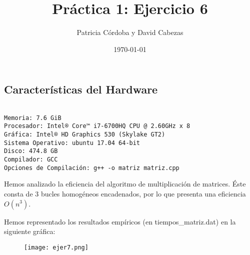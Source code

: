 \documentclass{article}
\begin{document}
\title{Práctica 1: Ejercicio 6}
\author{Patricia Córdoba y David Cabezas}
\date{\today}
\maketitle

\subsection*{Características del Hardware}
\begin{verbatim}

Memoria: 7.6 GiB
Procesador: Intel® Core™ i7-6700HQ CPU @ 2.60GHz x 8
Gráfica: Intel® HD Graphics 530 (Skylake GT2)
Sistema Operativo: ubuntu 17.04 64-bit
Disco: 474.8 GB
Compilador: GCC
Opciones de Compilación: g++ -o matriz matriz.cpp
\end{verbatim}

\begin{justify}
  Hemos analizado la eficiencia del algoritmo de multiplicación de
  matrices. Éste consta de 3 bucles homogéneos encadenados, por lo que
  presenta una eficiencia $O(n^3)$.
\end{justify}

\begin{justify}
  Hemos representado los resultados empíricos (en tiempos\_matriz.dat)
  en la siguiente gráfica:
\end{justify}

\begin{figure}[H]
  \centering
  \texttt{[image: ejer7.png]}
\end{figure}
\end{document}
